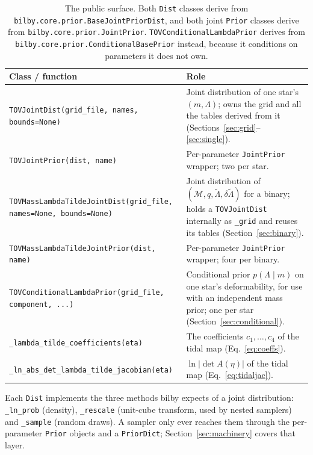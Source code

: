 \documentclass[11pt,a4paper]{article}
\newcommand{\Mc}{\mathcal{M}}
\newcommand{\lt}{\tilde{\Lambda}}
\newcommand{\dlt}{\delta\tilde{\Lambda}}
\newcommand{\code}[1]{\texttt{#1}}
\begin{document}
\begin{table}[h]
\centering
\begin{tabularx}{\textwidth}{lX}
\toprule
Class / function & Role \\
\midrule
\code{TOVJointDist(grid\_file, names, bounds=None)} &
  Joint distribution of one star's $(m, \Lambda)$; owns the grid and all the
  tables derived from it (Sections~\ref{sec:grid}--\ref{sec:single}). \\
\code{TOVJointPrior(dist, name)} &
  Per-parameter \code{JointPrior} wrapper; two per star. \\
\code{TOVMassLambdaTildeJointDist(grid\_file, names=None, bounds=None)} &
  Joint distribution of $(\Mc, q, \lt, \dlt)$ for a binary; holds a
  \code{TOVJointDist} internally as \code{\_grid} and reuses its tables
  (Section~\ref{sec:binary}). \\
\code{TOVMassLambdaTildeJointPrior(dist, name)} &
  Per-parameter \code{JointPrior} wrapper; four per binary. \\
\code{TOVConditionalLambdaPrior(grid\_file, component, ...)} &
  Conditional prior $p(\Lambda \mid m)$ on one star's deformability, for use
  with an independent mass prior; one per star (Section~\ref{sec:conditional}). \\
\code{\_lambda\_tilde\_coefficients(eta)} &
  The coefficients $c_1,\dots,c_4$ of the tidal map (Eq.~\ref{eq:coeffs}). \\
\code{\_ln\_abs\_det\_lambda\_tilde\_jacobian(eta)} &
  $\ln\lvert\det A(\eta)\rvert$ of the tidal map (Eq.~\ref{eq:tidaljac}). \\
\bottomrule
\end{tabularx}
\caption{The public surface. Both \code{Dist} classes derive from
\code{bilby.core.prior.BaseJointPriorDist}, and both joint \code{Prior} classes
derive from \code{bilby.core.prior.JointPrior}.
\code{TOVConditionalLambdaPrior} derives from
\code{bilby.core.prior.ConditionalBasePrior} instead, because it conditions on
parameters it does not own.}
\end{table}

\noindent
Each \code{Dist} implements the three methods bilby expects of a joint
distribution: \code{\_ln\_prob} (density), \code{\_rescale} (unit-cube
transform, used by nested samplers) and \code{\_sample} (random draws). A
sampler only ever reaches them through the per-parameter \code{Prior} objects
and a \code{PriorDict}; Section~\ref{sec:machinery} covers that layer.

\end{document}
